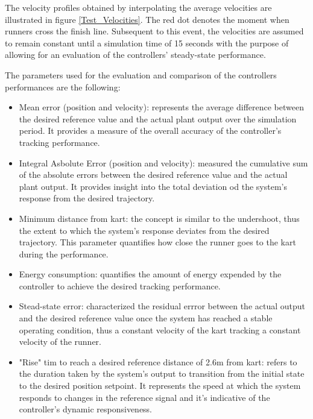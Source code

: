 \documentclass[a4paper,12pt,oneside]{book}
\begin{document}
The velocity profiles obtained by interpolating the average velocities are illustrated in figure \ref{Test_Velocities}.
The red dot denotes the moment when runners cross the finish line.
Subsequent to this event, the velocities are assumed to remain constant until a simulation time of 15 seconds with the purpose of allowing for an evaluation of the controllers' steady-state performance.

The parameters used for the evaluation and comparison of the controllers performances are the following:
\begin{itemize}
	\item Mean error (position and velocity): represents the average difference between the desired reference value and the actual plant output over the simulation period. It provides a measure of the overall accuracy of the controller's tracking performance.
	\item Integral Asbolute Error (position and velocity): measured the cumulative sum of the absolute errors between the desired reference value and the actual plant output. It provides insight into the total deviation od the system's response from the desired trajectory.
	\item Minimum distance from kart: the concept is similar to the undershoot, thus the extent to which the system's response deviates from the desired trajectory. This parameter quantifies how close the runner goes to the kart during the performance.
	\item Energy consumption: quantifies the amount of energy expended by the controller to achieve the desired tracking performance.
	\item Stead-state error: characterized the residual errror between the actual output and the desired reference value once the system has reached a stable operating condition, thus a constant velocity of the kart tracking a constant velocity of the runner.
	\item "Rise" tim to reach a desired reference distance of 2.6m from kart: refers to the duration taken by the system's output to transition from the initial state to the desired position setpoint. It represents the speed at which the system responds to changes in the reference signal and it's indicative of the controller's dynamic responsiveness.
\end{itemize}
\end{document}
